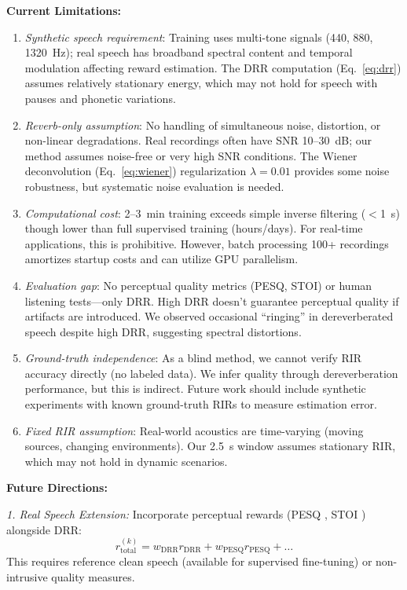 \documentclass[12pt,a4paper]{article}
\begin{document}
\textbf{Current Limitations:}
\begin{enumerate}
\item \textit{Synthetic speech requirement}: Training uses multi-tone signals (440, 880, 1320~Hz); real speech has broadband spectral content and temporal modulation affecting reward estimation. The DRR computation (Eq.~\eqref{eq:drr}) assumes relatively stationary energy, which may not hold for speech with pauses and phonetic variations.

\item \textit{Reverb-only assumption}: No handling of simultaneous noise, distortion, or non-linear degradations. Real recordings often have SNR 10--30~dB; our method assumes noise-free or very high SNR conditions. The Wiener deconvolution (Eq.~\eqref{eq:wiener}) regularization $\lambda=0.01$ provides some noise robustness, but systematic noise evaluation is needed.

\item \textit{Computational cost}: 2--3~min training exceeds simple inverse filtering ($<$1~s) though lower than full supervised training (hours/days). For real-time applications, this is prohibitive. However, batch processing 100+ recordings amortizes startup costs and can utilize GPU parallelism.

\item \textit{Evaluation gap}: No perceptual quality metrics (PESQ, STOI) or human listening tests---only DRR. High DRR doesn't guarantee perceptual quality if artifacts are introduced. We observed occasional ``ringing'' in dereverberated speech despite high DRR, suggesting spectral distortions.

\item \textit{Ground-truth independence}: As a blind method, we cannot verify RIR accuracy directly (no labeled data). We infer quality through dereverberation performance, but this is indirect. Future work should include synthetic experiments with known ground-truth RIRs to measure estimation error.

\item \textit{Fixed RIR assumption}: Real-world acoustics are time-varying (moving sources, changing environments). Our 2.5~s window assumes stationary RIR, which may not hold in dynamic scenarios.
\end{enumerate}

\textbf{Future Directions:}

\textit{1. Real Speech Extension:} Incorporate perceptual rewards (PESQ \cite{rix2001perceptual}, STOI \cite{taal2011algorithm}) alongside DRR:
\begin{equation}
r^{(k)}_{\text{total}} = w_{\text{DRR}} r_{\text{DRR}} + w_{\text{PESQ}} r_{\text{PESQ}} + \ldots
\end{equation}
This requires reference clean speech (available for supervised fine-tuning) or non-intrusive quality measures.
\end{document}
